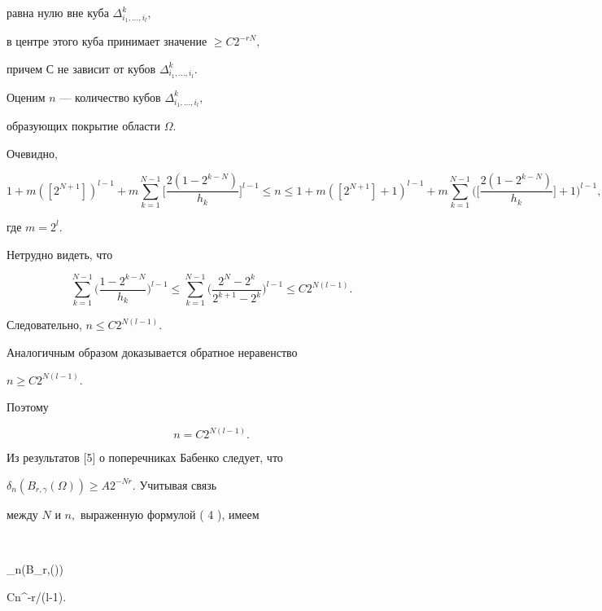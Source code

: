 равна нулю вне куба $\Delta^k_{i_1,\dots,i_l},$


в центре этого куба принимает значение $\ge C 2^{-rN},$


причем $С$ не зависит от кубов $\Delta^k_{i_1,\dotsc,i_l}.$





Оценим $n$ --- количество кубов $\Delta^k_{i_1,\dotsc,i_l},$


образующих покрытие области $\Omega.$


Очевидно,


$$


1+m([2^{N+1}])^{l-1}+m\sum_{k=1}^{N-1}


\bigg[\frac{2(1-2^{k-N})}{h_k}\bigg]^{l-1} \le n\le


1+m([2^{N+1}]+1)^{l-1}+m\sum_{k=1}^{N-1}


\bigg(\bigg[\frac{2(1-2^{k-N})}{h_k}\bigg]+1\bigg)^{l-1},


$$


где $m=2^l.$


Нетрудно видеть, что


$$


\sum_{k=1}^{N-1}\bigg(\frac{1-2^{k-N}}{h_k}\bigg)^{l-1}


\le \sum_{k=1}^{N-1}\bigg(\frac{2^{N}-


2^{k}}{2^{k+1}-2^{k}}\bigg)^{l-1} \le C2^{N(l-1)}.


$$


Следовательно, $ n\le C2^{N(l-1)}.$


Аналогичным образом доказывается обратное неравенство


$n\ge C2^{N(l-1)}.$


Поэтому


\begin{equation}


n=C2^{N(l-1)}.


\end{equation}





Из результатов [5] о поперечниках Бабенко следует, что


$\delta_n(B_{r,\gamma}(\Omega)) \ge A2^{-Nr}.$ Учитывая связь


между $ N $ и $ n ,$ выраженную формулой ( 4 ), имеем


$$


\delta_n(B_{r,\gamma}(\Omega))\ge


Cn^{-r/(l-1)}.\quad\square


